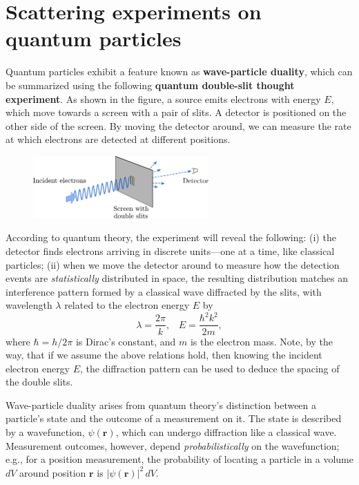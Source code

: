 \documentclass[pra,12pt]{revtex4}
\begin{document}

\section{Scattering experiments on quantum particles}

Quantum particles exhibit a feature known as \textbf{wave-particle
  duality}, which can be summarized using the following
\textbf{quantum double-slit thought experiment}.  As shown in the
figure, a source emits electrons with energy $E$, which move towards a
screen with a pair of slits.  A detector is positioned on the other
side of the screen.  By moving the detector around, we can measure the
rate at which electrons are detected at different positions.

\begin{figure}[h]
  \centering\includegraphics[width=0.6\textwidth]{doubleslit}
\end{figure}

According to quantum theory, the experiment will reveal the following:
(i) the detector finds electrons arriving in discrete units---one at a
time, like classical particles; (ii) when we move the detector around
to measure how the detection events are \textit{statistically}
distributed in space, the resulting distribution matches an
interference pattern formed by a classical wave diffracted by the
slits, with wavelength $\lambda$ related to the electron energy $E$ by
$$\lambda = \frac{2\pi}{k}, \;\;\; E = \frac{\hbar^2k^2}{2m},$$
where $\hbar = h/2\pi$ is Dirac's constant, and $m$ is the electron
mass.  Note, by the way, that if we assume the above relations hold,
then knowing the incident electron energy $E$, the diffraction pattern
can be used to deduce the spacing of the double slits.

Wave-particle duality arises from quantum theory's distinction between
a particle's state and the outcome of a measurement on it.  The state
is described by a wavefunction, $\psi(\mathbf{r})$, which can undergo
diffraction like a classical wave.  Measurement outcomes, however,
depend \textit{probabilistically} on the wavefunction; e.g., for a
position measurement, the probability of locating a particle in a
volume $dV$ around position $\mathbf{r}$ is $|\psi(\mathbf{r})|^2
\,dV$.
\end{document}

